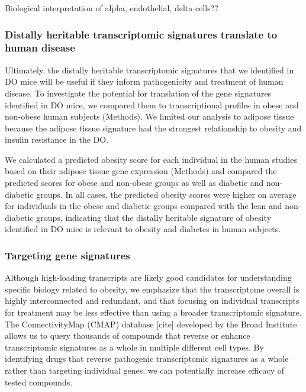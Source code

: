 \documentclass[
]{article}
\begin{document}
Biological interpretation of alpha, endothelial, delta cells??

\subsubsection{Distally heritable transcriptomic signatures translate to
human
disease}\label{distally-heritable-transcriptomic-signatures-translate-to-human-disease}

Ultimately, the distally heritable transcriptomic signatures that we
identified in DO mice will be useful if they inform pathogenicity and
treatment of human disease. To investigate the potential for translation
of the gene signatures identified in DO mice, we compared them to
transcriptional profiles in obese and non-obese human subjects
(Methods). We limited our analysis to adipose tissue because the adipose
tissue signature had the strongest relationship to obesity and insulin
resistance in the DO.

We calculated a predicted obesity score for each individual in the human
studies based on their adipose tissue gene expression (Methods) and
compared the predicted scores for obese and non-obese groups as well as
diabetic and non-diabetic groups. In all cases, the predicted obesity
scores were higher on average for individuals in the obese and diabetic
groups compared with the lean and non-diabetic groups, indicating that
the distally heritable signature of obesity identified in DO mice is
relevant to obesity and diabetes in human subjects.

\subsubsection{Targeting gene
signatures}\label{targeting-gene-signatures}

Although high-loading transcripts are likely good candidates for
understanding specific biology related to obesity, we emphasize that the
transcriptome overall is highly interconnected and redundant, and that
focusing on individual transcripts for treatment may be less effective
than using a broader transcriptomic signature. The ConnectivityMap
(CMAP) database {[}cite{]} developed by the Broad Institute allows us to
query thousands of compounds that reverse or enhance transcriptomic
signatures as a whole in multiple different cell types. By identifying
drugs that reverse pathogenic transcriptomic signatures as a whole
rather than targeting individual genes, we can potentially increase
efficacy of tested compounds.
\end{document}
